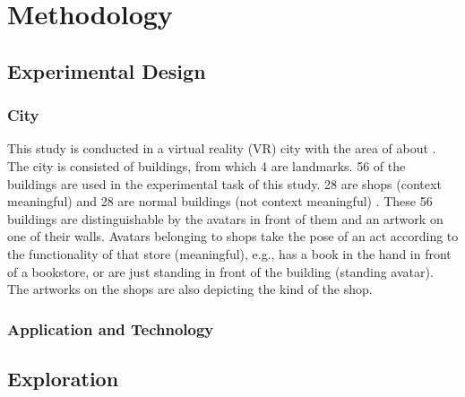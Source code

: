 \chapter{Methodology}

\section{Experimental Design}


\subsection{City}

This study is conducted in a virtual reality (VR) city with the area of about . The city is consisted of  buildings, from which 4 are landmarks. 56 of the buildings are used in the experimental task of this study. 28 are shops {\emphasize(context meaningful)} and 28 are normal buildings {\emphasize(not context meaningful)} . These 56 buildings are distinguishable by the avatars \todo{[or agents?]} in front of them and an artwork on one of their walls. Avatars belonging to shops take the pose of an act according to the functionality of that store {\emphasize(meaningful)}, e.g., has a book in the hand in front of a bookstore, or are just standing in front of the building {\emphasize(standing avatar)}. The artworks on the shops are also depicting the kind of the shop.


\subsection{Application and Technology}

\section{Exploration}

